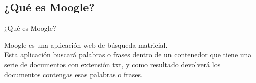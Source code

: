 \subsection{¿Qué es Moogle?}
\begin{frame}{¿Qué es Moogle?}
    \begin{center}
        Moogle es una aplicación web de búsqueda matricial. \\
        \pause
        \vspace*{1cm}
        Esta aplicación buscará palabras o frases dentro de un contenedor que tiene una serie
        de documentos con extensión txt, y como resultado devolverá los documentos contengas
        esas palabras o frases.
    \end{center}
\end{frame}
